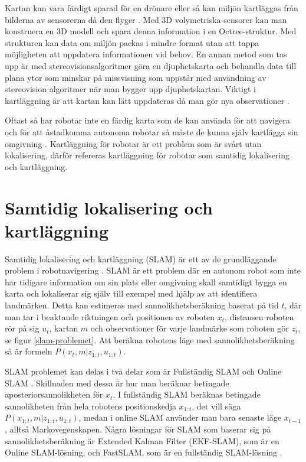Kartan kan vara färdigt sparad för en drönare eller så kan miljön kartläggas från bilderna av sensorerna då den flyger \citep{geospatial}. Med 3D volymetriska sensorer kan man konstruera en 3D modell och spara denna information i en Octree-struktur. Med strukturen kan data om miljön packas i mindre format utan att tappa möjligheten att uppdatera informationen vid behov. En annan metod som tas upp är med stereovisionsalgoritmer göra en djuphetskarta och behandla data till plana ytor som minskar på missvisning som uppstår med användning av stereovision algoritmer när man bygger upp djuphetskartan. Viktigt i kartläggning är att kartan kan lätt uppdateras då man gör nya observationer \citep{globalsubmaps}.

Oftast så har robotar inte en färdig karta som de kan använda för att navigera och för att åstadkomma autonoma robotar så måste de kunna själv kartlägga sin omgivning \citep{ProbabilisticRobotics}. Kartläggning för robotar är ett problem som är svårt utan lokalisering, därför refereras kartläggning för robotar som samtidig lokalisering och kartläggning. 

\chapter{Samtidig lokalisering och kartläggning}

Samtidig lokalisering och kartläggning (SLAM) är ett av de grundläggande problem i robotnavigering \citep{realslamproblem}. SLAM är ett problem där en autonom robot som inte har tidigare information om sin plats eller omgivning skall samtidigt bygga en karta och lokaliserar sig själv till exempel med hjälp av att identifiera landmärken. Detta kan estimeras med sannolikhetsberäkning baserat på tid $t$, där man tar i beaktande riktningen och positionen av roboten $x_t$, distansen roboten rör på sig $u_t$,  kartan $m$ och observationer för varje landmärke som roboten gör $z_t$, se figur \ref{slam-problemet}. Att beräkna robotens läge med sannolikhetsberäkning så är formeln $P(x_t, m|z_{1:t}, u_{1:t})$. 

SLAM problemet kan delas i två delar som är Fullständig SLAM och Online SLAM \citep{ProbabilisticRobotics}. Skillnaden med dessa är hur man beräknar betingade aposteriorsannolikheten för $x_t$. I fullständig SLAM beräknas betingade sannolikheten från hela robotens positionskedja $x_{1:t}$, det vill säga $P(x_{1:t}, m | z_{1:t}, u_{1:t})$, medan i online SLAM använder man bara senaste läge $x_{t-1}$, alltså Markovegenskapen. Några lösningar för SLAM som baserar sig på sannolikhetsberäkning är Extended Kalman Filter (EKF-SLAM), som är en Online SLAM-lösning, och FastSLAM, som är en fullständig SLAM-lösning \citep{realslamproblem, ProbabilisticRobotics}. 

